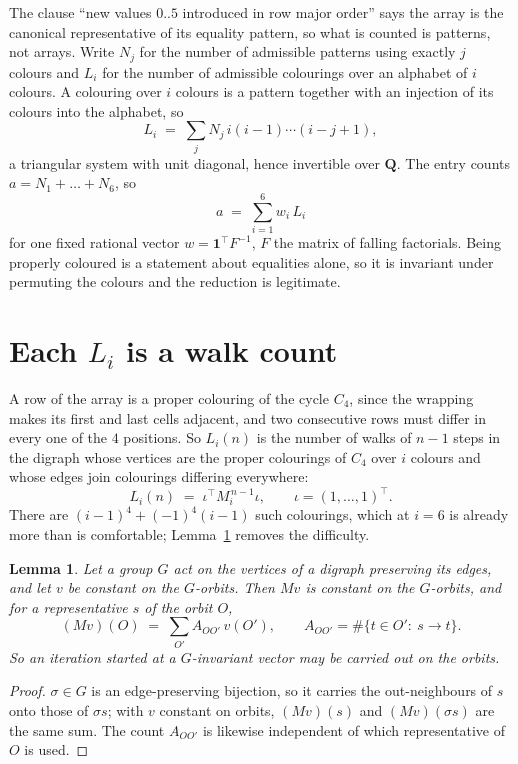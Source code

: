 \documentclass[11pt,a4paper]{article}
\theoremstyle{plain}
\newtheorem{lemma}[theorem]{Lemma}
\theoremstyle{definition}
\begin{document}
The clause ``new values $0..5$ introduced in row major order'' says the array is the
canonical representative of its equality pattern, so what is counted is patterns, not arrays.
Write $N_j$ for the number of admissible patterns using exactly $j$ colours and $L_i$ for the
number of admissible colourings over an alphabet of $i$ colours. A colouring over $i$ colours
is a pattern together with an injection of its colours into the alphabet, so
\[
L_i\;=\;\sum_j N_j\,i(i-1)\cdots(i-j+1),
\]
a triangular system with unit diagonal, hence invertible over $\mathbf{Q}$. The entry counts
$a=N_1+\dots+N_{6}$, so
\[
a\;=\;\sum_{i=1}^{6}w_i\,L_i
\]
for one fixed rational vector $w=\mathbf{1}^{\!\top}F^{-1}$, $F$ the matrix of falling
factorials. Being properly coloured is a statement about equalities alone, so it is invariant
under permuting the colours and the reduction is legitimate.

\section{Each $L_i$ is a walk count}

A row of the array is a proper colouring of the cycle $C_{4}$, since the wrapping makes
its first and last cells adjacent, and two consecutive rows must differ in every one of the
$4$ positions. So $L_i(n)$ is the number of walks of $n-1$ steps in the digraph whose
vertices are the proper colourings of $C_{4}$ over $i$ colours and whose edges join
colourings differing everywhere:
\[
L_i(n)\;=\;\iota^{\!\top}M_i^{\,n-1}\iota ,\qquad \iota=(1,\dots,1)^{\!\top} .
\]
There are $(i-1)^{4}+(-1)^{4}(i-1)$ such colourings, which at $i=6$ is already more
than is comfortable; Lemma~\ref{lem:lump} removes the difficulty.

\begin{lemma}\label{lem:lump}
Let a group $G$ act on the vertices of a digraph preserving its edges, and let $v$ be constant
on the $G$-orbits. Then $Mv$ is constant on the $G$-orbits, and for a representative $s$ of
the orbit $O$,
\[
(Mv)(O)\;=\;\sum_{O'}A_{OO'}\,v(O'),\qquad
A_{OO'}=\#\{t\in O':\ s\to t\} .
\]
So an iteration started at a $G$-invariant vector may be carried out on the orbits.
\end{lemma}

\begin{proof}
$\sigma\in G$ is an edge-preserving bijection, so it carries the out-neighbours of $s$ onto
those of $\sigma s$; with $v$ constant on orbits, $(Mv)(s)$ and $(Mv)(\sigma s)$ are the same
sum. The count $A_{OO'}$ is likewise independent of which representative of $O$ is used.
\end{proof}
\end{document}

